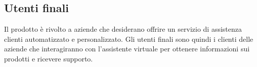\subsection{Utenti finali}
Il prodotto è rivolto a aziende che desiderano offrire un servizio di assistenza 
clienti automatizzato e personalizzato. Gli utenti finali sono quindi i clienti 
delle aziende che interagiranno con l’assistente virtuale per ottenere 
informazioni sui prodotti e ricevere supporto.
